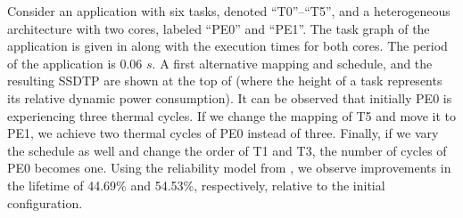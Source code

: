 Consider an application with six tasks, denoted ``T0''--``T5'', and a heterogeneous architecture with two cores, labeled ``PE0'' and ``PE1''. The task graph of the application is given in  along with the execution times for both cores. The period of the application is 0.06 $s$. A first alternative mapping and schedule, and the resulting SSDTP are shown at the top of  (where the height of a task represents its relative dynamic power consumption). It can be observed that initially PE0 is experiencing three thermal cycles. If we change the mapping of T5 and move it to PE1, we achieve two thermal cycles of PE0 instead of three. Finally, if we vary the schedule as well and change the order of T1 and T3, the number of cycles of PE0 becomes one. Using the reliability model from , we observe improvements in the lifetime of 44.69\% and 54.53\%, respectively, relative to the initial configuration.
